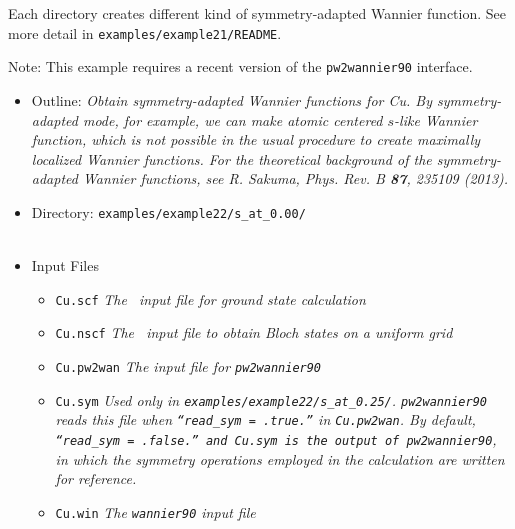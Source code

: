 \documentclass[a4paper,11pt,twoside]{article}
\begin{document}
Each directory creates different kind of symmetry-adapted Wannier function. 
See more detail in {\tt examples/example21/README}. 




Note: This example requires a recent version of the {\tt pw2wannier90} interface.

\begin{itemize}
\item{Outline: \it{Obtain symmetry-adapted Wannier functions for Cu. By symmetry-adapted mode, for example, we can make atomic centered $s$-like Wannier function, which is not possible in the usual procedure to create maximally localized Wannier functions.
For the theoretical background of the symmetry-adapted Wannier functions, see R. Sakuma,  Phys. Rev. B {\bf 87}, 235109 (2013).}}
\item{Directory: {\tt examples/example22/s\_at\_0.00/} \\
\phantom{Directory: }{\tt examples/example22/s\_at\_0.25/}    \\
\phantom{Directory: }{\tt examples/example22/s\_at\_0.50/}    
}
\item{Input Files}
\begin{itemize}
\item{ {\tt Cu.scf}  {\it The \pwscf\ input file for ground state
    calculation}} 
\item{ {\tt Cu.nscf}  {\it The \pwscf\ input file to obtain Bloch
    states on a uniform grid}} 
\item{ {\tt Cu.pw2wan}  {\it The input file for {\tt pw2wannier90}}}
\item{ {\tt Cu.sym}  {\it Used only in {\tt examples/example22/s\_at\_0.25/}. {\tt pw2wannier90} reads this file when {\tt ``read\_sym = .true.''} in {\tt Cu.pw2wan}. By default, {\tt ``read\_sym = .false.'' and {\tt Cu.sym} is the output of {\tt pw2wannier90}}, in which the symmetry operations employed in the calculation are written for reference. } } 
\item{ {\tt Cu.win}  {\it The {\tt wannier90} input file}}
\end{itemize}
\end{itemize}
\end{document}
